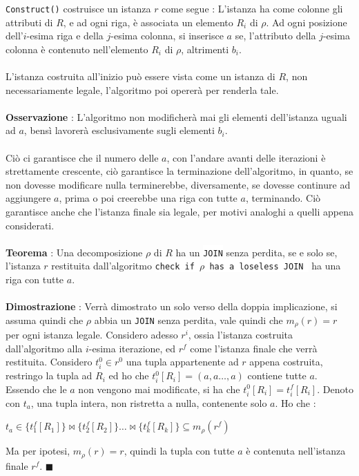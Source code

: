 \documentclass[12pt, letterpaper]{article}
\newcommand{\code}[1]{\colorbox{light-gray}{\texttt{#1}}}
\newcommand{\codee}[1]{\colorbox{white}{\texttt{#1}}}
\newcommand{\acc}{\\\hphantom{}\\}
\begin{document}
\code{Construct()} costruisce un istanza \(r\) come segue : L'istanza ha come colonne gli attributi di \(R\), 
 e ad ogni riga, è associata un elemento \(R_i\) di \(\rho\). Ad ogni posizione dell'\(i\)-esima riga
 e della \(j\)-esima colonna, si inserisce \(a\) se, l'attributo della \(j\)-esima colonna è  
contenuto nell'elemento \(R_i\) di \(\rho\), altrimenti \(b_i\). \acc 
L'istanza costruita all'inizio può essere vista come un istanza di \(R\), non necessariamente legale, l'algoritmo poi opererà 
per renderla tale.\acc 
\textbf{Osservazione} : L'algoritmo non modificherà mai gli elementi dell'istanza uguali ad \(a\), bensì lavorerà esclusivamente 
sugli elementi \(b_i\).\acc 
Ciò ci garantisce che il numero delle \(a\), con l'andare avanti delle iterazioni è strettamente crescente, ciò garantisce la 
terminazione dell'algoritmo, in quanto, se non dovesse modificare nulla terminerebbe, diversamente, se dovesse 
continure ad aggiungere \(a\), prima o poi creerebbe una riga con tutte \(a\), terminando. Ciò  garantisce 
anche che l'istanza finale sia legale, per motivi analoghi a quelli appena considerati.\acc 
\textbf{Teorema} : Una decomposizione \(\rho\) di \(R\) ha un  \codee{JOIN} senza perdita, se e solo se, l'istanza 
\(r\) restituita dall'algoritmo \codee{check if }\(\rho\)\codee{ has a loseless JOIN } ha una riga 
con tutte \(a\).\acc 
\textbf{Dimostrazione} : Verrà dimostrato un solo verso della doppia implicazione, si assuma quindi che 
\(\rho\) abbia un \codee{JOIN} senza perdita, vale quindi che  \(m_\rho(r)=r\) per ogni istanza legale. Considero 
adesso \(r^i\), ossia l'istanza costruita dall'algoritmo alla \(i\)-esima iterazione, ed \(r^f\) come l'istanza 
finale che verrà restituita. Considero \(t_i^0\in r^0\) una tupla appartenente ad \(r\) appena costruita, restringo 
la tupla ad \(R_i\) ed ho che \(t^0_i[R_i]=(a,a\dots,a)\) contiene tutte \(a\). Essendo che le \(a\) non vengono mai 
modificate, si ha che \(t^0_i[R_i]=t^f_i[R_i]\). Denoto con \(t_a\), una tupla intera, non ristretta a nulla, contenente 
solo \(a\). Ho che :\begin{center}
    \(t_a\in\{t_1^f[R_1]\}\Join\{t_2^f[R_2]\}\dots \Join\{t_k^f[R_k]\}\subseteq m_\rho(r^f)\)
\end{center}
Ma per ipotesi, \(m_\rho(r)=r\), quindi la tupla con tutte \(a\) è contenuta nell'istanza finale \(r^f\). \(\blacksquare\)
\end{document}
